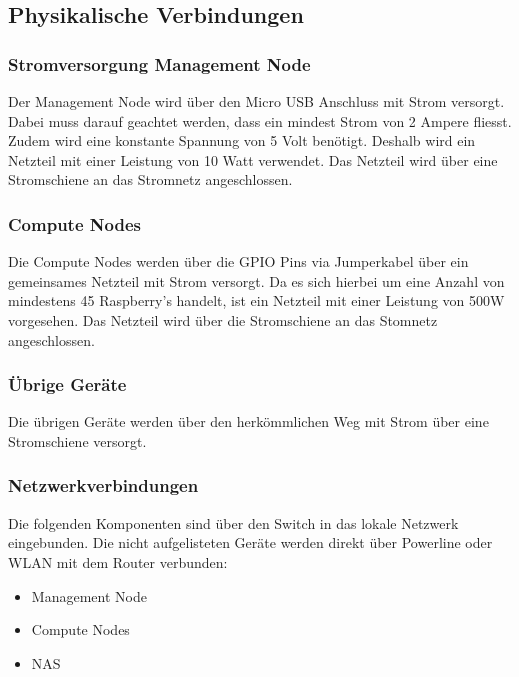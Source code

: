 \subsection{Physikalische Verbindungen}

\subsubsection{Stromversorgung Management Node}
Der Management Node wird über den Micro USB Anschluss mit Strom versorgt. Dabei muss darauf geachtet werden, dass ein mindest Strom von 2 Ampere fliesst. Zudem wird eine konstante Spannung von 5 Volt benötigt. Deshalb wird ein Netzteil mit einer Leistung von 10 Watt verwendet. Das Netzteil wird über eine Stromschiene an das Stromnetz angeschlossen.

\subsubsection{Compute Nodes}
Die Compute Nodes werden über die GPIO Pins via Jumperkabel über ein gemeinsames Netzteil mit Strom versorgt. Da es sich hierbei um eine Anzahl von mindestens 45 Raspberry's handelt, ist ein Netzteil mit einer Leistung von 500W vorgesehen. Das Netzteil wird über die Stromschiene an das Stomnetz angeschlossen.


\subsubsection{Übrige Geräte}
Die übrigen Geräte werden über den herkömmlichen Weg mit Strom über eine Stromschiene versorgt.

\subsubsection{Netzwerkverbindungen}
Die folgenden Komponenten sind über den Switch in das lokale Netzwerk eingebunden. Die nicht aufgelisteten Geräte werden direkt über Powerline oder WLAN mit dem Router verbunden:
\begin{itemize}
\item Management Node
\item Compute Nodes
\item NAS
\end{itemize}


